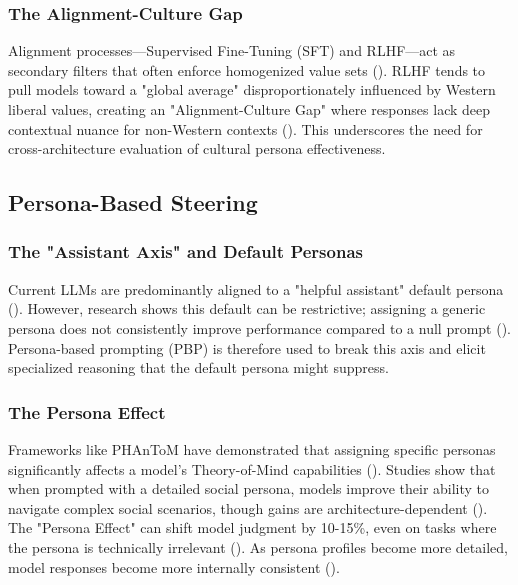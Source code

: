 \documentclass{article}
\begin{document}
\subsubsection{The Alignment-Culture Gap}

Alignment processes—Supervised Fine-Tuning (SFT) and RLHF—act as secondary filters that often enforce homogenized value sets (\cite{minsang_kim_43ca3c83}). RLHF tends to pull models toward a "global average" disproportionately influenced by Western liberal values, creating an "Alignment-Culture Gap" where responses lack deep contextual nuance for non-Western contexts (\cite{nicholas_sukiennik_6b60add4}). This underscores the need for cross-architecture evaluation of cultural persona effectiveness.

\subsection{Persona-Based Steering}

\subsubsection{The "Assistant Axis" and Default Personas}

Current LLMs are predominantly aligned to a "helpful assistant" default persona (\cite{christina_lu_520bd0ae}). However, research shows this default can be restrictive; assigning a generic persona does not consistently improve performance compared to a null prompt (\cite{mingqian_zheng_2dd4a908}). Persona-based prompting (PBP) is therefore used to break this axis and elicit specialized reasoning that the default persona might suppress.

\subsubsection{The Persona Effect}

Frameworks like PHAnToM have demonstrated that assigning specific personas significantly affects a model's Theory-of-Mind capabilities (\cite{gerard_yeo_2544df62}). Studies show that when prompted with a detailed social persona, models improve their ability to navigate complex social scenarios, though gains are architecture-dependent (\cite{jing_yang_699d9c2c}). The "Persona Effect" can shift model judgment by 10-15\%, even on tasks where the persona is technically irrelevant (\cite{tiancheng_hu_49571f40}). As persona profiles become more detailed, model responses become more internally consistent (\cite{yuqing_bai_9d1d72ff}).
\end{document}
